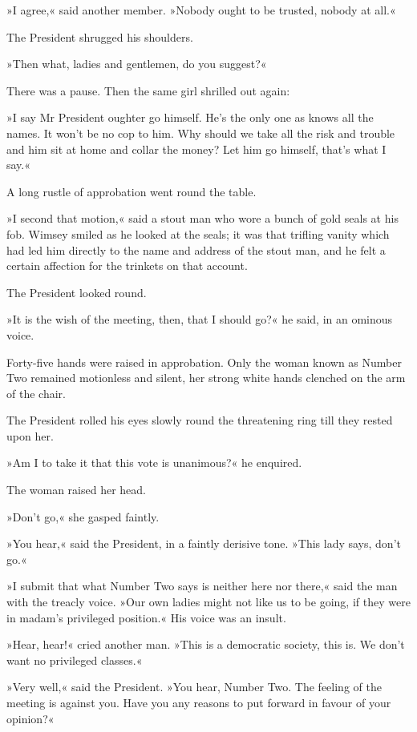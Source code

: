 »I agree,« said another member. »Nobody ought to be trusted, nobody at all.«

The President shrugged his shoulders.

»Then what, ladies and gentlemen, do you suggest?«

There was a pause. Then the same girl shrilled out again:

»I say Mr President oughter go himself. He's the only one as knows all the names. It won't be no cop to him. Why should we take all the risk and trouble and him sit at home and collar the money? Let him go himself, that's what I say.«

A long rustle of approbation went round the table.

»I second that motion,« said a stout man who wore a bunch of gold seals at his fob. Wimsey smiled as he looked at the seals; it was that trifling vanity which had led him directly to the name and address of the stout man, and he felt a certain affection for the trinkets on that account.

The President looked round.

»It is the wish of the meeting, then, that I should go?« he said, in an ominous voice.

Forty-five hands were raised in approbation. Only the woman known as Number Two remained motionless and silent, her strong white hands clenched on the arm of the chair.

The President rolled his eyes slowly round the threatening ring till they rested upon her.

»Am I to take it that this vote is unanimous?« he enquired.

The woman raised her head.

»Don't go,« she gasped faintly.

»You hear,« said the President, in a faintly derisive tone. »This lady says, don't go.«

»I submit that what Number Two says is neither here nor there,« said the man with the treacly voice. »Our own ladies might not like us to be going, if they were in madam's privileged position.« His voice was an insult.

»Hear, hear!« cried another man. »This is a democratic society, this is. We don't want no privileged classes.«

»Very well,« said the President. »You hear, Number Two. The feeling of the meeting is against you. Have you any reasons to put forward in favour of your opinion?«

